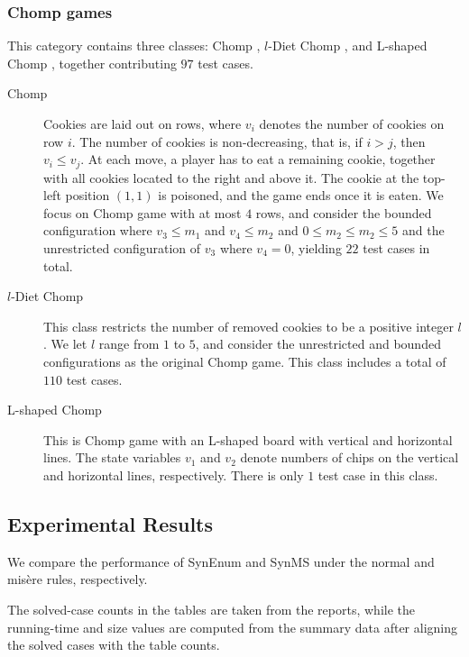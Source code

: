 \documentclass[review]{elsarticle}
\begin{document}
\subsubsection{Chomp games}
This category contains three classes: Chomp \cite{Sch1952}, $l$-Diet Chomp \cite{AhnCCEFGGKMPS2017}, and L-shaped Chomp \cite{Sch1952}, together contributing $97$ test cases.

\begin{description}
	\item[Chomp] Cookies are laid out on rows, where $v_i$ denotes the number of cookies on row $i$.
	The number of cookies is non-decreasing, that is, if $i > j$, then $v_i \leq v_j$.
	At each move, a player has to eat a remaining cookie, together with all cookies located to the right and above it. 
	The cookie at the top-left position $(1, 1)$ is poisoned, and the game ends once it is eaten. 
	We focus on Chomp game with at most $4$ rows, and consider the bounded configuration where $v_3 \leq m_1$ and $v_4 \leq m_2$ and $0 \leq m_2 \leq m_2 \leq 5$ and the unrestricted configuration of $v_3$ where $v_4 = 0$, yielding $22$ test cases in total.
	
	\item[$l$-Diet Chomp] This class restricts the number of removed cookies to be a positive integer $l$.
	We let $l$ range from $1$ to $5$, and consider the unrestricted and bounded configurations as the original Chomp game.
	This class includes a total of $110$ test cases.
	
	\item[L-shaped Chomp] This is Chomp game with an L-shaped board with vertical and horizontal lines. 
	The state variables $ v_1$ and $v_2$ denote numbers of chips on the vertical and horizontal lines, respectively.
	There is only $1$ test case in this class.
\end{description}



\subsection{Experimental Results}


We compare the performance of SynEnum and SynMS under the normal and mis\`{e}re rules, respectively.

The solved-case counts in the tables are taken from the reports, while the running-time and size values are computed from the summary data after aligning the solved cases with the table counts.
\end{document}
